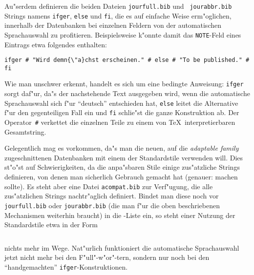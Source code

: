 Au"serdem definieren die beiden Dateien {\tt jourfull.bib} und {\tt
jourabbr.bib} Strings namens \verb|ifger|, \verb|else| und \verb|fi|, die es
auf einfache Weise erm"oglichen, innerhalb der Datenbanken bei einzelnen
Feldern von der automatischen Sprachauswahl zu profitieren. Beispielsweise
k"onnte damit das \verb|NOTE|-Feld eines Eintrags etwa folgendes enthalten:
\begin{verbatim}
ifger # "Wird demn{\"a}chst erscheinen." # else # "To be published." # fi
\end{verbatim}
Wie man unschwer erkennt, handelt es sich um eine bedingte Anweisung:
\verb|ifger| sorgt daf"ur, da"s der nachstehende Text ausgegeben wird, wenn
die automatische Sprachauswahl sich f"ur "`deutsch"' entschieden hat,
\verb|else| leitet die Alternative f"ur den gegenteiligen Fall ein und
\verb|fi| schlie"st die ganze Konstruktion ab. Der Operator~\verb|#|
verkettet die einzelnen Teile zu einem von \TeX\ interpretierbaren
Gesamtstring.

Gelegentlich mag es vorkommen, da"s man die neuen, auf die {\em adaptable
family\/} zugeschnittenen Datenbanken mit einem der Standardstile verwenden
will. Dies st"o"st auf Schwierigkeiten, da die anpa"sbaren Stile einige
zus"atzliche Strings definieren, von denen man sicherlich Gebrauch gemacht
hat (genauer: machen sollte). Es steht aber eine Datei {\tt acompat.bib} zur
Verf"ugung, die alle zus"atzlichen Strings nachtr"aglich definiert. Bindet
man diese noch vor {\tt jourfull.bib} oder {\tt jourabbr.bib} (die man f"ur
die oben beschriebenen Mechanismen weiterhin braucht) in die
\verb||-Liste ein, so steht einer Nutzung der Standardstile
etwa in der Form
\begin{verbatim}

\end{verbatim}
nichts mehr im Wege. Nat"urlich funktioniert die automatische Sprachauswahl
jetzt nicht mehr bei den F"ull"-w"or"-tern, sondern nur noch bei den
"`handgemachten"' \verb|ifger|-Konstruktionen.

